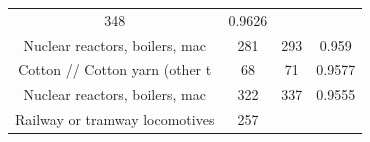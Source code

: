 \documentclass[10pt,]{article}
\begin{document}
\begin{longtable}[]{@{}cccc@{}}
\begin{minipage}[t]{0.20\columnwidth}
348\strut
\end{minipage} & \begin{minipage}[t]{0.09\columnwidth}\centering\strut
0.9626\strut
\end{minipage}\tabularnewline
\begin{minipage}[t]{0.38\columnwidth}\centering\strut
Nuclear reactors, boilers, mac\strut
\end{minipage} & \begin{minipage}[t]{0.21\columnwidth}\centering\strut
281\strut
\end{minipage} & \begin{minipage}[t]{0.20\columnwidth}\centering\strut
293\strut
\end{minipage} & \begin{minipage}[t]{0.09\columnwidth}\centering\strut
0.959\strut
\end{minipage}\tabularnewline
\begin{minipage}[t]{0.38\columnwidth}\centering\strut
Cotton // Cotton yarn (other t\strut
\end{minipage} & \begin{minipage}[t]{0.21\columnwidth}\centering\strut
68\strut
\end{minipage} & \begin{minipage}[t]{0.20\columnwidth}\centering\strut
71\strut
\end{minipage} & \begin{minipage}[t]{0.09\columnwidth}\centering\strut
0.9577\strut
\end{minipage}\tabularnewline
\begin{minipage}[t]{0.38\columnwidth}\centering\strut
Nuclear reactors, boilers, mac\strut
\end{minipage} & \begin{minipage}[t]{0.21\columnwidth}\centering\strut
322\strut
\end{minipage} & \begin{minipage}[t]{0.20\columnwidth}\centering\strut
337\strut
\end{minipage} & \begin{minipage}[t]{0.09\columnwidth}\centering\strut
0.9555\strut
\end{minipage}\tabularnewline
\begin{minipage}[t]{0.38\columnwidth}\centering\strut
Railway or tramway locomotives\strut
\end{minipage} & \begin{minipage}[t]{0.21\columnwidth}\centering\strut
257\strut
\end{minipage} & \begin{minipage}[t]{0.20\columnwidth}\centering\strut

\end{minipage}
\end{longtable}
\end{document}
